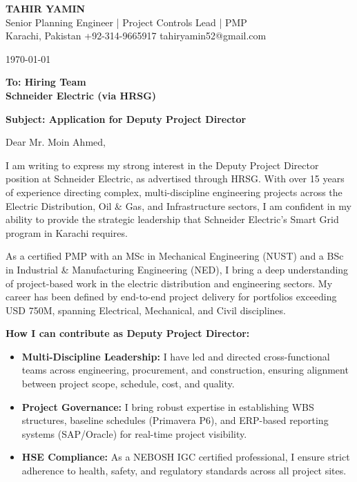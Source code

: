 \documentclass[11pt,a4paper]{article}
\begin{document}
\begin{center}
    {\Huge \textbf{\color{awesome-darknight} TAHIR YAMIN}} \\[0.2cm]
    {\Large \color{awesome-gray} Senior Planning Engineer | Project Controls Lead | PMP} \\[0.3cm]
    
    \small \color{light-gray}
    Karachi, Pakistan \quad \textbullet \quad 
    +92-314-9665917 \quad \textbullet \quad 
    tahiryamin52@gmail.com
\end{center}

\vspace{0.8cm}
\today
\vspace{0.5cm}

\textbf{To: Hiring Team} \\
\textbf{Schneider Electric (via HRSG)} \\
\vspace{0.5cm}

\textbf{Subject: Application for Deputy Project Director}

\vspace{0.5cm}

Dear Mr. Moin Ahmed,

I am writing to express my strong interest in the Deputy Project Director position at Schneider Electric, as advertised through HRSG. With over 15 years of experience directing complex, multi-discipline engineering projects across the Electric Distribution, Oil \& Gas, and Infrastructure sectors, I am confident in my ability to provide the strategic leadership that Schneider Electric's Smart Grid program in Karachi requires.

As a certified PMP with an MSc in Mechanical Engineering (NUST) and a BSc in Industrial \& Manufacturing Engineering (NED), I bring a deep understanding of project-based work in the electric distribution and engineering sectors. My career has been defined by end-to-end project delivery for portfolios exceeding USD 750M, spanning Electrical, Mechanical, and Civil disciplines.

\textbf{How I can contribute as Deputy Project Director:}
\begin{itemize}
    \item \textbf{Multi-Discipline Leadership:} I have led and directed cross-functional teams across engineering, procurement, and construction, ensuring alignment between project scope, schedule, cost, and quality.
    \item \textbf{Project Governance:} I bring robust expertise in establishing WBS structures, baseline schedules (Primavera P6), and ERP-based reporting systems (SAP/Oracle) for real-time project visibility.
    \item \textbf{HSE Compliance:} As a NEBOSH IGC certified professional, I ensure strict adherence to health, safety, and regulatory standards across all project sites.
\end{itemize}
\end{document}
